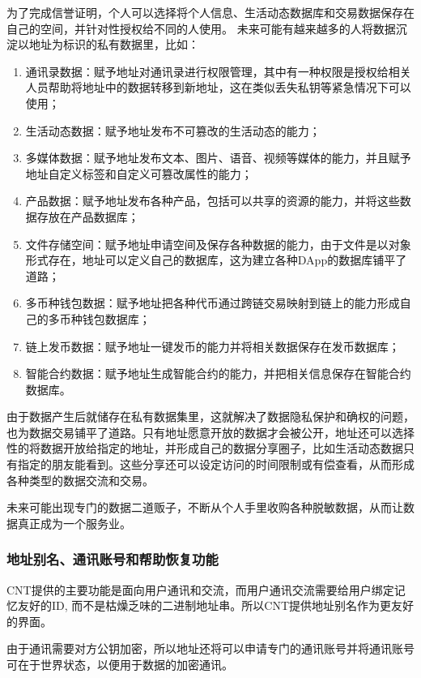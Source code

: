 \documentclass[a4paper,12pt]{article}
\begin{document}
为了完成信誉证明，个人可以选择将个人信息、生活动态数据库和交易数据保存在自己的空间，并针对性授权给不同的人使用。
未来可能有越来越多的人将数据沉淀以地址为标识的私有数据里，比如：

\begin{enumerate}[itemindent=1em]
\item 通讯录数据：赋予地址对通讯录进行权限管理，其中有一种权限是授权给相关人员帮助将地址中的数据转移到新地址，这在类似丢失私钥等紧急情况下可以使用；
\item 生活动态数据：赋予地址发布不可篡改的生活动态的能力；
\item 多媒体数据：赋予地址发布文本、图片、语音、视频等媒体的能力，并且赋予地址自定义标签和自定义可篡改属性的能力；
\item 产品数据：赋予地址发布各种产品，包括可以共享的资源的能力，并将这些数据存放在产品数据库；
\item 文件存储空间：赋予地址申请空间及保存各种数据的能力，由于文件是以对象形式存在，地址可以定义自己的数据库，这为建立各种DApp的数据库铺平了道路；
\item 多币种钱包数据：赋予地址把各种代币通过跨链交易映射到链上的能力形成自己的多币种钱包数据库；
\item 链上发币数据：赋予地址一键发币的能力并将相关数据保存在发币数据库；
\item 智能合约数据：赋予地址生成智能合约的能力，并把相关信息保存在智能合约数据库。
\end{enumerate}

由于数据产生后就储存在私有数据集里，这就解决了数据隐私保护和确权的问题，也为数据交易铺平了道路。只有地址愿意开放的数据才会被公开，地址还可以选择性的将数据开放给指定的地址，并形成自己的数据分享圈子，比如生活动态数据只有指定的朋友能看到。这些分享还可以设定访问的时间限制或有偿查看，从而形成各种类型的数据交流和交易。

未来可能出现专门的数据二道贩子，不断从个人手里收购各种脱敏数据，从而让数据真正成为一个服务业。

\subsubsection{地址别名、通讯账号和帮助恢复功能}

CNT提供的主要功能是面向用户通讯和交流，而用户通讯交流需要给用户绑定记忆友好的ID, 而不是枯燥乏味的二进制地址串。所以CNT提供地址别名作为更友好的界面。

由于通讯需要对方公钥加密，所以地址还将可以申请专门的通讯账号并将通讯账号可在于世界状态，以便用于数据的加密通讯。
\end{document}
